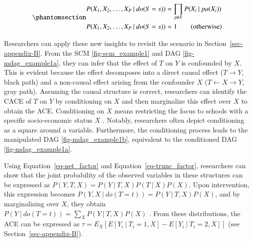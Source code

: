 \documentclass[
  authoryear,
  review,
  1p]{elsarticle}
\begin{document}
\begin{equation}\phantomsection\label{eq-trunc_factor}{
\begin{aligned}
P(X_{1}, X_{2}, \dots, X_{P} \: | \: do(S=s)) & = \prod_{p \not\in S} P(X_{i} \: | \: pa(X_{i}) ) \\
P(X_{1}, X_{2}, \dots, X_{P} \: | \: do(S=s)) & = 1 \quad \quad (\text{otherwise})
\end{aligned}
}\end{equation}

Researchers can apply these new insights to revisit the scenario in
Section~\ref{sec-appendix-B}. From the SCM \ref{fig-scm_example1} and
DAG \ref{fig-mdag_example1a}, they can infer that the effect of \(T\) on
\(Y\) is confounded by \(X\). This is evident because the effect
decomposes into a direct causal effect (\(T \rightarrow Y\), black path)
and a non-causal effect arising from the confounder \(X\)
(\(T \leftarrow X \rightarrow Y\), gray path). Assuming the causal
structure is correct, researchers can identify the CACE of \(T\) on
\(Y\) by conditioning on \(X\) and then marginalize this effect over
\(X\) to obtain the ACE. Conditioning on \(X\) means restricting the
focus to schools with a specific socio-economic status \(X\)
\citep[pp.~32]{Neal_2020}. Notably, researchers often depict
conditioning as a square around a variable. Furthermore, the
conditioning process leads to the manipulated DAG
\ref{fig-mdag_example1b}, equivalent to the conditioned DAG
\ref{fig-mdag_example1a}.

Using Equation~\ref{eq-net_factor} and Equation~\ref{eq-trunc_factor},
researchers can show that the joint probability of the observed
variables in these structures can be expressed as
\(P(Y, T, X) = P(Y \: | \: T, X) P(T \: | \: X) P(X)\). Upon
intervention, this expression becomes
\(P(Y, X \: | \: do(T=t)) = P(Y \: | \: T,X) P(X)\), and by
marginalizing over \(X\), they obtain
\(P(Y \: | \: do(T=t)) = \sum_{X} P(Y \: | \: T,X) P(X)\)
\citep[pp.~36]{Neal_2020}. From these distributions, the ACE can be
expressed as
\(\tau = E_{X}\left[ E[Y_{i} \: | \: T_{i}=1, X] - E[Y_{i} \: | \: T_{i}=2, X] \right]\)
(see Section~\ref{sec-appendix-B}).
\end{document}
